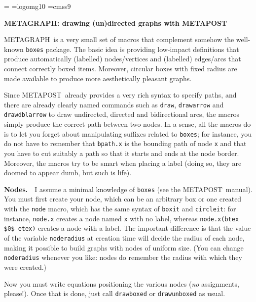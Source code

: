\hsize=6.25in
\vsize=9.65in %
\parskip=\smallskipamount
\parindent=0pt
\font\manfnt=logomg10
\font\ssf=cmss9

\def\METAPOST{{\manfnt METAPOST}}
\def\METAGRAPH{{\manfnt METAGRAPH}}
\def\example#1{\par\bigskip\centerline{\tt #1}\bigskip}
\def\begincode{\par\bigskip\bgroup\obeylines\parindent=2cm\parskip=0pt\tt}
\def\endcode{\egroup\par\bigskip}
\def\\{$\backslash$}

\centerline{\bf\METAGRAPH: drawing (un)directed graphs with \METAPOST}
\METAGRAPH\ is a very small set of macros that complement somehow the well-known {\tt boxes}
package. The basic idea is providing low-impact definitions that produce automatically
(labelled) nodes/vertices and (labelled) edges/arcs that connect correctly boxed items. 
Moreover, circular boxes with fixed radius are made available to produce more aesthetically
pleasant graphs.

Since \METAPOST\ already provides a very rich syntax to specify paths, and there are already
clearly named commands such as {\tt draw}, {\tt drawarrow} and {\tt drawdblarrow} to draw
undirected, directed and bidirectional arcs, the macros simply produce the correct path
between two nodes. In a sense, all the macros do is to let you forget about manipulating
suffixes related to {\tt boxes}; for instance, you do not have to remember that {\tt bpath.x}
is the bounding path of node {\tt x} and that you have to cut suitably a path so that it starts
and ends at the node border. Moreover, the macros try to be smart when placing a label (doing so, they
are doomed to appear dumb, but such is life).

{\bf Nodes.}~~I assume a minimal knowledge of {\tt boxes} (see the \METAPOST\ manual). You must first create your
node, which can be an arbitrary box or one created with the {\tt node} macro, which has the same
syntax of {\tt boxit} and {\tt circleit}: for instance, {\tt node.x}
creates a node named {\tt x} with no label, whereas {\tt node.x(btex \$0\$ etex)} creates a node with
a label. The important difference is that the value of the variable {\tt noderadius} at creation time
will decide the radius of each node, making it possible to build graphs with nodes of uniform size.
(You can change {\tt noderadius} whenever you like: nodes do remember the radius with which they were created.)

Now you must write equations positioning the various nodes ({\it no\/} assignments, please!). Once that
is done, just call {\tt drawboxed} or {\tt drawunboxed} as usual.

